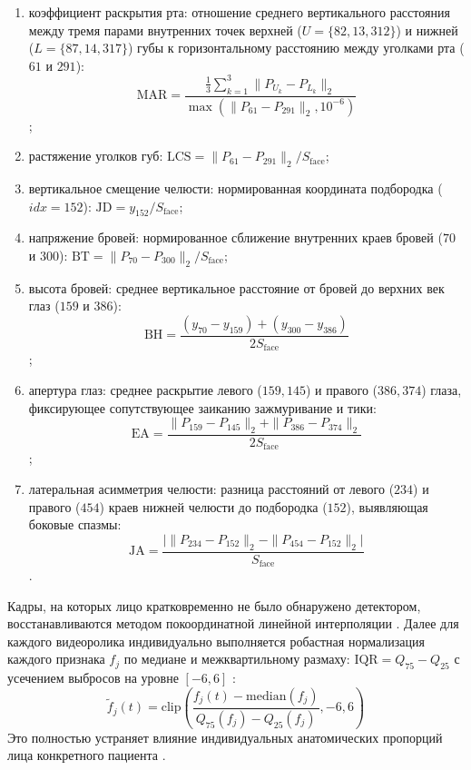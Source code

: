 \documentclass[a4paper,14pt]{extarticle}
\begin{document}
	\begin{enumerate}
		\item коэффициент раскрытия рта: отношение среднего вертикального расстояния между тремя парами внутренних точек верхней ($U = \{82, 13, 312\}$) и нижней ($L = \{87, 14, 317\}$) губы к горизонтальному расстоянию между уголками рта ($61$ и $291$):
		\begin{equation}
			\text{MAR} = \frac{\frac{1}{3} \sum_{k=1}^{3} \| P_{U_k} - P_{L_k} \|_2}{\max(\| P_{61} - P_{291} \|_2, 10^{-6})}
		\end{equation};
		\item растяжение уголков губ: $\text{LCS} = \| P_{61} - P_{291} \|_2 / S_{\text{face}}$;
		\item вертикальное смещение челюсти: нормированная координата подбородка ($idx = 152$): $\text{JD} = y_{152} / S_{\text{face}}$;
		\item напряжение бровей: нормированное сближение внутренних краев бровей ($70$ и $300$): $\text{BT} = \| P_{70} - P_{300} \|_2 / S_{\text{face}}$;
		\item высота бровей: среднее вертикальное расстояние от бровей до верхних век глаз ($159$ и $386$):
		\begin{equation}
			\text{BH} = \frac{(y_{70} - y_{159}) + (y_{300} - y_{386})}{2 S_{\text{face}}}
		\end{equation};
		\item апертура глаз: среднее раскрытие левого ($159, 145$) и правого ($386, 374$) глаза, фиксирующее сопутствующее заиканию зажмуривание и тики:
		\begin{equation}
			\text{EA} = \frac{\| P_{159} - P_{145} \|_2 + \| P_{386} - P_{374} \|_2}{2 S_{\text{face}}}
		\end{equation};
		\item латеральная асимметрия челюсти: разница расстояний от левого ($234$) и правого ($454$) краев нижней челюсти до подбородка ($152$), выявляющая боковые спазмы:
		\begin{equation}
			\text{JA} = \frac{\big| \| P_{234} - P_{152} \|_2 - \| P_{454} - P_{152} \|_2 \big|}{S_{\text{face}}}
		\end{equation}.
	\end{enumerate}
	
	Кадры, на которых лицо кратковременно не было обнаружено детектором, восстанавливаются методом покоординатной линейной интерполяции \cite{ivankin}. Далее для каждого видеоролика индивидуально выполняется робастная нормализация каждого признака $f_j$ по медиане и межквартильному размаху: $\text{IQR} = Q_{75} - Q_{25}$ с усечением выбросов на уровне $[-6, 6]$ \cite{ivankin}:
	\begin{equation}
		\tilde{f}_j(t) = \text{clip}\left( \frac{f_j(t) - \text{median}(f_j)}{Q_{75}(f_j) - Q_{25}(f_j)}, -6, 6 \right)
	\end{equation}
	Это полностью устраняет влияние индивидуальных анатомических пропорций лица конкретного пациента \cite{ivankin}.
	
\end{document}
